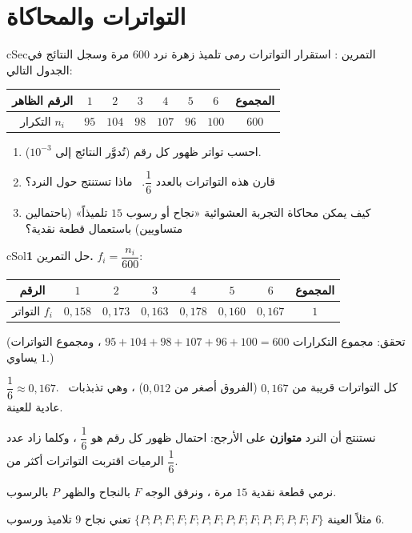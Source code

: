 \documentclass[12pt,a4paper]{article}
\newenvironment{BOX}[2]{\begin{otherlanguage}{english}\begin{arbox}{#1}{#2}}{\end{arbox}\end{otherlanguage}}
\newcounter{exo}
\newenvironment{tamrin}[1]{\stepcounter{exo}\begin{BOX}{cSec}{التمرين \theexo: #1}}{\end{BOX}}
\newenvironment{hal}{\Needspace{12\baselineskip}\begin{otherlanguage}{english}\begin{arbox}[breakable]{cSol}{حل التمرين \theexo}}{\end{arbox}\end{otherlanguage}}
\newcommand{\ar}[1]{\foreignlanguage{arabic}{#1}}
\begin{document}
\section{التواترات والمحاكاة}
\begin{tamrin}{استقرار التواترات}
رمى تلميذ زهرة نرد $600$ مرة وسجل النتائج في الجدول التالي:
\begin{center}
\renewcommand{\arraystretch}{1.3}
\begin{tabular}{|C|c|c|c|c|c|c|c|}\hline
{}الرقم الظاهر & $1$ & $2$ & $3$ & $4$ & $5$ & $6$ & \ar{المجموع}\\
\hline
التكرار $n_i$ & $95$ & $104$ & $98$ & $107$ & $96$ & $100$ & $600$\\
\hline
\end{tabular}
\end{center}
\begin{enumerate}
\item احسب تواتر ظهور كل رقم (تُدوَّر النتائج إلى $10^{-3}$).
\item قارن هذه التواترات بالعدد $\dfrac16$. \ ماذا تستنتج حول النرد؟
\item كيف يمكن محاكاة التجربة العشوائية «نجاح أو رسوب $15$ تلميذاً» (باحتمالين متساويين) باستعمال قطعة نقدية؟
\end{enumerate}
\end{tamrin}
\begin{hal}
\textbf{1.} $f_i=\dfrac{n_i}{600}$:
\begin{center}
\renewcommand{\arraystretch}{1.3}
\begin{tabular}{|C|c|c|c|c|c|c|c|}\hline
{}الرقم & $1$ & $2$ & $3$ & $4$ & $5$ & $6$ & \ar{المجموع}\\
\hline
التواتر $f_i$ & $0{,}158$ & $0{,}173$ & $0{,}163$ & $0{,}178$ & $0{,}160$ & $0{,}167$ & $1$\\
\hline
\end{tabular}
\end{center}
(تحقق: مجموع التكرارات $95+104+98+107+96+100=600$ ، ومجموع التواترات يساوي $1$.)

 $\dfrac16\approx0{,}167$. \ كل التواترات قريبة من $0{,}167$ (الفروق أصغر من $0{,}012$) ، وهي تذبذبات عادية للعينة.\par
نستنتج أن النرد \textbf{متوازن} على الأرجح: احتمال ظهور كل رقم هو $\dfrac16$ ، وكلما زاد عدد الرميات اقتربت التواترات أكثر من $\dfrac16$.

 نرمي قطعة نقدية $15$ مرة ، ونرفق الوجه $F$ بالنجاح والظهر $P$ بالرسوب.\par
مثلاً العينة $\{P;P;F;F;F;P;F;P;F;F;P;F;P;F;F\}$ تعني نجاح $9$ تلاميذ ورسوب $6$.
\end{hal}
\end{document}
